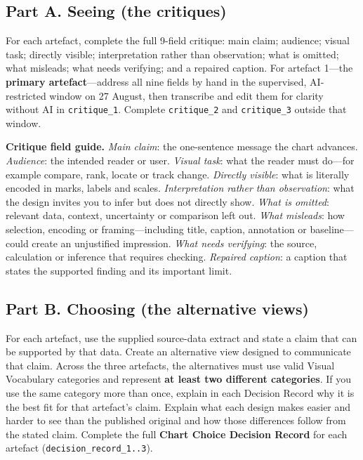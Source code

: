 \documentclass[11pt,a4paper]{article}
\newcommand{\labelbox}[1]{\colorbox{panel}{\texttt{\small #1}}}
\begin{document}
\subsection*{Part A. Seeing (the critiques)}

For each artefact, complete the full 9-field critique:
main claim; audience; visual task; directly visible; interpretation rather
than observation; what is omitted; what misleads; what needs verifying; and
a repaired caption. For artefact 1---the \textbf{primary artefact}---address all
nine fields by hand in the supervised, AI-restricted window on 27 August, then
transcribe and edit them for clarity without AI in \labelbox{critique\_1}.
Complete \labelbox{critique\_2} and \labelbox{critique\_3} outside that window.

\textbf{Critique field guide.} \emph{Main claim}: the one-sentence message the
chart advances. \emph{Audience}: the intended reader or user. \emph{Visual
task}: what the reader must do---for example compare, rank, locate or track
change. \emph{Directly visible}: what is literally encoded in marks, labels and
scales. \emph{Interpretation rather than observation}: what the design invites
you to infer but does not directly show. \emph{What is omitted}: relevant data,
context, uncertainty or comparison left out. \emph{What misleads}: how selection,
encoding or framing---including title, caption, annotation or baseline---could
create an unjustified impression. \emph{What needs verifying}: the source,
calculation or inference that requires checking. \emph{Repaired caption}: a
caption that states the supported finding and its important limit.

\subsection*{Part B. Choosing (the alternative views)}

For each artefact, use the supplied source-data extract and state a claim that
can be supported by that data. Create an alternative view designed to
communicate that claim. Across the three artefacts, the alternatives must use
valid Visual Vocabulary categories and represent \textbf{at least two different
categories}. If you use the same category more than once, explain in each
Decision Record why it is the best fit for that artefact's claim. Explain what each design
makes easier and harder to see than the published original and how those
differences follow from the stated claim. Complete the full \textbf{Chart
Choice Decision Record} for each artefact
(\labelbox{decision\_record\_1..3}).
\end{document}
